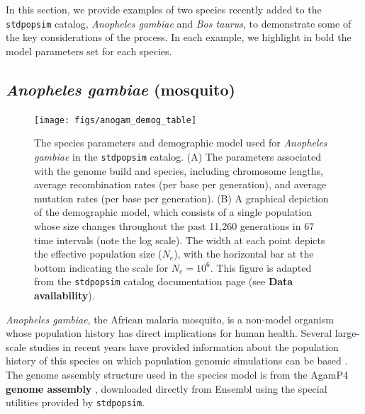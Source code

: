 \documentclass[hidelinks]{article}
\newcommand{\stdpopsim}{\texttt{stdpopsim}\xspace}
\begin{document}
In this section, we provide examples of two species recently added to the \stdpopsim catalog,
\textit{Anopheles gambiae} and \textit{Bos taurus},
to demonstrate some of the key considerations of the process.
In each example, we highlight in bold the model parameters set for each species.

\subsection*{\texorpdfstring{\emph{Anopheles gambiae} (mosquito)}{Anopheles gambiae (mosquito)}}
    \label{AnoGam}
    
\begin{figure}[b!]
	\texttt{[image: figs/anogam\_demog\_table]}
	\caption{The species parameters and demographic model used for \emph{Anopheles gambiae} in the \stdpopsim catalog.
	(A) The parameters associated with the genome build and species, including
	chromosome lengths, average recombination rates (per base per generation),
	and average mutation rates (per base per generation).
	(B) A graphical depiction of the demographic model,
	which consists of a single population whose size changes throughout the past 11,260 generations in 67 time intervals (note the log scale). The width at each point depicts the effective population size ($N_e$), with the horizontal bar at the bottom indicating the scale for $N_e=10^6$.
	This figure is adapted from the \stdpopsim catalog documentation page (see {\bf Data availability}).
		\label{fig:anogam} }
\end{figure}


\emph{Anopheles gambiae}, the African malaria mosquito, is 
a non-model organism whose population history has direct implications for human health.
Several large-scale studies in recent years have provided information about the
population history of this species on which population genomic simulations can be based \citep[e.g.,][]{Miles2017, clarkson2020genome}.
The genome assembly structure used in the species model is from
the AgamP4 \textbf{genome assembly} \citep{Sharakhova2007},
downloaded directly from Ensembl \citep{ensembl2021}
using the special utilities provided by \stdpopsim.
\end{document}
